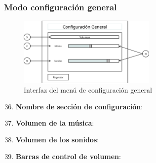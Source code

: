 \subsubsection{Modo configuración general}
\begin{figure}[H]
    \centering
    \includegraphics[width=0.6\textwidth]{5-Cuerpo/Chapter5/I10.png} %
    \caption{Interfaz del menú de configuración general}
    \label{fig:Interface_Configuracion_General}
\end{figure}
\begin{enumerate}\setcounter{enumi}{35}
    \item \textbf{Nombre de sección de configuración}:
    \item \textbf{Volumen de la música}:
    \item \textbf{Volumen de los sonidos}:
    \item \textbf{Barras de control de volumen}:
\end{enumerate}